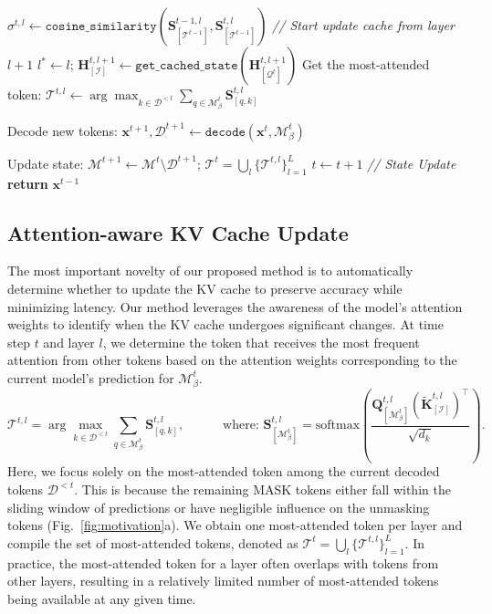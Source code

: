\documentclass{article} %
\theoremstyle{definition}
\theoremstyle{remark}
\begin{document}
\begin{algorithm*}[t]
\begin{algorithmic}[1]
            \State $\sigma^{t,l} \gets \texttt{cosine\_similarity}(\mathbf{S}^{t-1,l}_{[\mathcal{T}^{t-1}]}, \mathbf{S}^{t,l}_{[\mathcal{T}^{t-1}]})$
             \hfill \textcolor{updategreen}{\textit{// Start update cache from layer $l+1$}}
                \State $l^* \gets l$; \quad $ \mathbf{H}^{t,l+1}_{[\mathcal{I}]}\gets \texttt{get\_cached\_state}( \mathbf{H}^{t,l+1}_{[\mathcal{Q}^t]})$
            \EndIf
        \EndIf
        \State Get the most-attended token: $\mathcal{T}^{t,l} \gets \arg\max_{k \in \mathcal{D}^{<t}} \sum_{q \in \mathcal{M}^{t}_\beta} \mathbf{S}^{t,l}_{[q, k]}$
    \EndFor

    \State Decode new tokens: $\mathbf{x}^{t+1},\mathcal{D}^{t+1} \leftarrow \texttt{decode}(\mathbf{x}^t, \mathcal{M}^t_\beta)$ 
    
    \State Update state: $\mathcal{M}^{t+1} \leftarrow \mathcal{M}^{t} \setminus \mathcal{D}^{t+1} $; \quad $\mathcal{T}^{t} = \bigcup_{l} \{\mathcal{T}^{t,l}\}_{l=1}^L$ \quad $t \gets t + 1$ \hfill \textcolor{updategreen}{\textit{// State Update}}
\EndWhile
\State \textbf{return} $\mathbf{x}^{t-1}$
\end{algorithmic}
\label{alg:elastic-cache}
\end{algorithm*}

\subsection{Attention-aware KV Cache Update}
The most important novelty of our proposed method is to automatically determine whether to update the KV cache to preserve accuracy while minimizing latency. Our method leverages the awareness of the model's attention weights to identify when the KV cache undergoes significant changes.
At time step $t$ and layer $l$, we determine the token that receives the most frequent attention from other tokens based on the attention weights corresponding to the current model’s prediction for $\mathcal{M}^{t}_{\beta}$. 
\vspace{-0.1in}
\begin{equation}
    \mathcal{T}^{t,l} = \arg\max_{k \in \mathcal{D}^{<t}} \sum_{q \in \mathcal{M}^{t}_\beta} \mathbf{S}^{t,l}_{[q, k]},
    \quad \quad \quad \text{where: } \mathbf{S}^{t,l}_{[\mathcal{M}^{t}_{\beta}]} = \text{softmax}\left(\frac{\mathbf{Q}^{t,l}_{[ \mathcal{M}^{t}_\beta]}(\mathbf{\tilde K}^{t,l}_{[\mathcal{I}]})^\top}{\sqrt{d_k}}\right).
\end{equation}
Here, we focus solely on the most-attended token among the current decoded tokens $\mathcal{D}^{<t}$. This is because the remaining MASK tokens either fall within the sliding window of predictions or have negligible influence on the unmasking tokens (Fig.~\ref{fig:motivation}a). We obtain one most-attended token per layer and compile the set of most-attended tokens, denoted as  $\mathcal{T}^{t} = \bigcup_{l} \{\mathcal{T}^{t,l}\}_{l=1}^L$. In practice, the most-attended token for a layer often overlaps with tokens from other layers, resulting in a relatively limited number of most-attended tokens being available at any given time.
\end{document}
